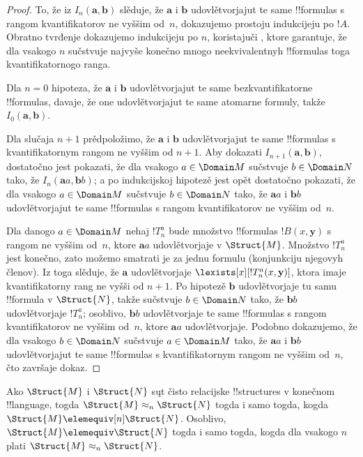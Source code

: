\documentclass[../../../include/open-logic-section]{subfiles}
\begin{document}
\begin{proof}
  To, že iz $I_n(\mathbf{a},\mathbf{b})$ slěduje, že $\mathbf{a}$ i
  $\mathbf{b}$ udovlětvorjajut te same !!{formula}s s rangom
  kvantifikatorov ne vyššim od~$n$, dokazujemo prostoju indukcijeju po
  $!A$. Obratno tvrđenje dokazujemo indukcijeju po $n$, koristajuči
  , ktore garantuje, že dla vsakogo $n$
  sučstvuje najvyše konečno mnogo neekvivalentnyh !!{formula}s toga
  kvantifikatornogo ranga.

  Dla $n=0$ hipoteza, že $\mathbf{a}$ i $\mathbf{b}$ udovlětvorjajut
  te same bezkvantifikatorne !!{formula}s, davaje, že one
  udovlětvorjajut te same atomarne formuly, takže
  $I_0(\mathbf{a},\mathbf{b})$.

  Dla slučaja $n+1$ prědpoložimo, že $\mathbf{a}$ i $\mathbf{b}$
  udovlětvorjajut te same !!{formula}s s kvantifikatornym rangom ne
  vyššim od $n+1$. Aby dokazati $I_{n+1}(\mathbf{a},\mathbf{b})$,
  dostatočno jest pokazati, že dla vsakogo $a \in \Domain M$
  sučstvuje $b \in
  \Domain N$ tako, že
  $I_n(\mathbf{a}a,\mathbf{b}b)$; a po indukcijskoj hipotezě jest
  opět dostatočno pokazati, že dla vsakogo $a \in \Domain M$
  sučstvuje $b \in \Domain N$ tako, že $\mathbf{a}a$ i
  $\mathbf{b}b$ udovlětvorjajut te same !!{formula}s s rangom
  kvantifikatorov ne vyššim od~$n$.

  Dla danogo $a \in \Domain M$ nehaj $!T^a_n$ bude množstvo
  !!{formula}s $!B(x,\mathbf{y})$ s rangom ne vyššim od~$n$, ktore
  $\mathbf{a}a$ udovlětvorjaje v $\Struct{M}$. Množstvo $!T^a_n$ jest
  konečno, zato možemo smatrati je za jednu formulu (konjunkciju
  njegovyh členov). Iz toga slěduje, že $\mathbf{a}$ udovlětvorjaje
  $\lexists[x][!T^a_n(x,\mathbf{y})]$, ktora imaje kvantifikatorny rang
  ne vyšši od $n+1$. Po hipotezě $\mathbf{b}$ udovlětvorjaje tu samu
  !!{formula} v $\Struct{N}$, takže sučstvuje $b \in \Domain N$ tako,
  že $\mathbf{b}b$ udovlětvorjaje $!T^a_n$; osoblivo,
  $\mathbf{b}b$ udovlětvorjaje te same !!{formula}s s rangom
  kvantifikatorov ne vyššim od~$n$, ktore $\mathbf{a}a$
  udovlětvorjaje. Podobno dokazujemo, že dla vsakogo
  $b \in \Domain N$ sučstvuje $a\in
  \Domain M$ tako, že
  $\mathbf{a}a$ i $\mathbf{b}b$ udovlětvorjajut te same !!{formula}s
  s kvantifikatornym rangom ne vyššim od~$n$, čto završaje dokaz.
\end{proof}

\begin{cor}
  Ako $\Struct{M}$ i $\Struct{N}$ sųt čisto relacijske
  !!{structure}s v konečnom !!{language}, togda
  $\Struct{M} \approx_n\Struct{N}$ togda i samo togda, kogda
  $\Struct{M} \elemequiv[n] \Struct{N}$. Osoblivo,
  $\Struct{M} \elemequiv \Struct{N}$ togda i samo togda, kogda dla
  vsakogo $n$ plati $\Struct{M} \approx_n \Struct{N}$.
\end{cor}
\end{document}
